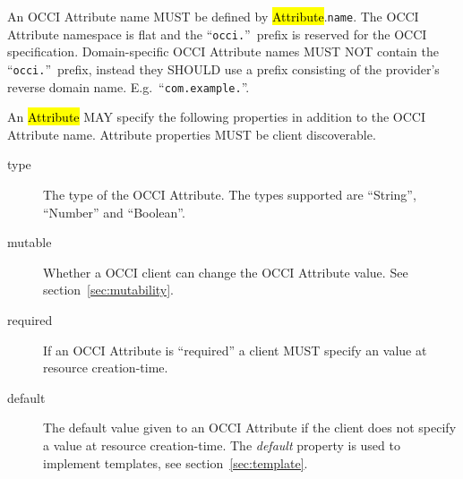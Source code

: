 \documentclass[10pt,a4paper]{article}
\begin{document}

An OCCI Attribute name MUST be defined by \hl{Attribute}.{\tt name}. The
OCCI Attribute namespace is flat and the ``\texttt{occi.}''~prefix is reserved
for the OCCI specification.
Domain-specific OCCI Attribute names MUST NOT contain the
``\texttt{occi.}''~prefix, instead they SHOULD use a prefix consisting of the
provider's reverse domain name. E.g.~``\texttt{com.example.}''.

An \hl{Attribute} MAY specify the following properties in addition to the OCCI
Attribute name. Attribute properties MUST be client discoverable.
\begin{description}
\item[type] The type of the OCCI Attribute. The types supported are ``String'',
  ``Number'' and ``Boolean''.

\item[mutable] Whether a OCCI client can change the OCCI Attribute value. See
  section~\ref{sec:mutability}.

\item[required] If an OCCI Attribute is ``required'' a client MUST specify an
  value at resource creation-time.

\item[default] The default value given to an OCCI Attribute if the client does
  not specify a value at resource creation-time.  The {\em default} property is
  used to implement templates, see section~\ref{sec:template}.
\end{description}
\end{document}
